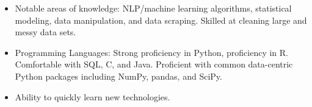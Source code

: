 \documentclass[letterpaper,10pt]{article}
\newcommand{\resitem}[1]{\item #1 \vspace{-2pt}}
\begin{document}
\begin{itemize}
    \resitem{Notable areas of knowledge: NLP/machine learning algorithms, statistical modeling, data manipulation, and data scraping. Skilled at cleaning large and messy data sets.}
    \resitem{Programming Languages: Strong proficiency in Python, proficiency in R. Comfortable with SQL, C, and Java. Proficient with common data-centric Python packages including NumPy, pandas, and SciPy. }%
    \resitem{Ability to quickly learn new technologies.}
\end{itemize}
\end{document}
